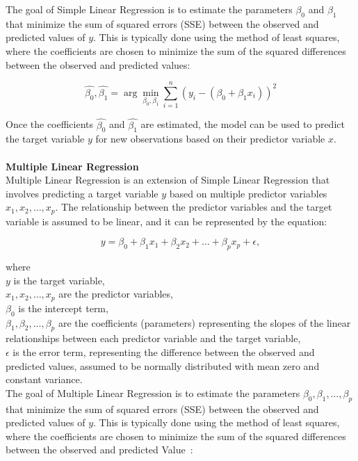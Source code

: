 \documentclass[12pt]{report}
\begin{document}
\noindent The goal of Simple Linear Regression is to estimate the parameters \(\beta_0\) and \(\beta_1\) that minimize the sum of squared errors (SSE) between the observed and predicted values of \(y\). This is typically done using the method of least squares, where the coefficients are chosen to minimize the sum of the squared differences between the observed and predicted values:

\begin{equation}
    \hat{\beta_0}, \hat{\beta_1} = \arg \min_{\beta_0, \beta_1} \sum_{i=1}^{n} (y_i - (\beta_0 + \beta_1 x_i))^2
\end{equation}

\noindent Once the coefficients \(\hat{\beta_0}\) and \(\hat{\beta_1}\) are estimated, the
model can be used to predict the target variable \(y\) for new observations based on their
predictor variable \(x\).\\
\\
\textbf{Multiple Linear Regression}\\
Multiple Linear Regression is an extension of Simple Linear Regression that involves predicting a target variable \(y\) based on multiple predictor variables \(x_1, x_2, \ldots, x_p\). The relationship between the predictor variables and the target variable is assumed to be linear, and it can be represented by the equation:

\begin{equation}
    y = \beta_0 + \beta_1 x_1 + \beta_2 x_2 + \ldots + \beta_p x_p + \epsilon,
\end{equation}

\noindent where\\
\(y\) is the target variable,\\
\(x_1, x_2, \ldots, x_p\) are the predictor variables,\\
\(\beta_0\) is the intercept term,\\
\(\beta_1, \beta_2, \ldots, \beta_p\) are the coefficients (parameters) representing the slopes of the linear relationships between each predictor variable and the target variable,\\
\(\epsilon\) is the error term, representing the difference between the observed and predicted values, assumed to be normally distributed with mean zero and constant variance.\\

\noindent The goal of Multiple Linear Regression is to estimate the
parameters \(\beta_0, \beta_1, \ldots, \beta_p\) that minimize the sum of squared
errors (SSE) between the observed and predicted values of \(y\). This is typically done
using the method of least squares, where the coefficients are chosen to minimize the
sum of the squared differences between the observed and predicted Value~\cite{witte2017statistics}:
\end{document}
